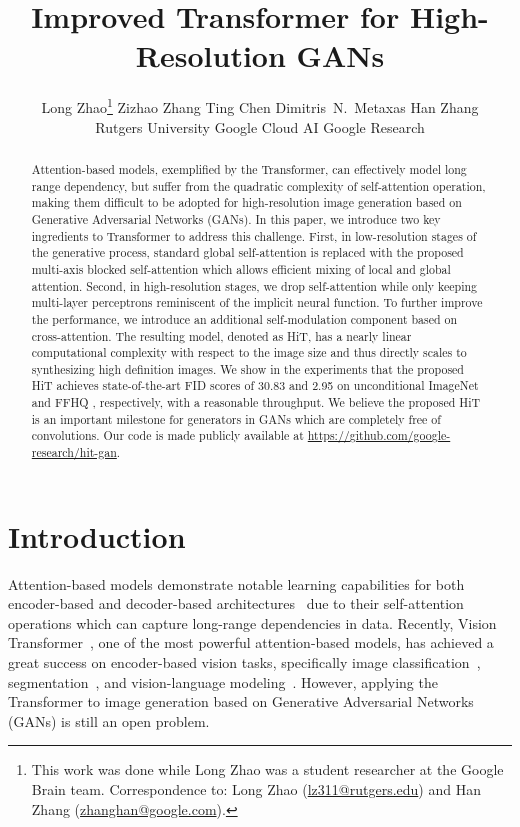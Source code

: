 \documentclass{article}
\title{Improved Transformer for High-Resolution GANs}
\author{
Long Zhao\thanks{This work was done while Long Zhao was a student researcher at the Google Brain team. Correspondence to: Long Zhao (\href{mailto:lz311@cs.rutgers.edu}{lz311@rutgers.edu}) and Han Zhang (\href{mailto:zhanghan@google.com}{zhanghan@google.com}).}
\quad 
Zizhao Zhang 
\quad 
Ting Chen 
\quad
Dimitris~N.~Metaxas
\quad
Han Zhang  \\
 Rutgers University \quad Google Cloud AI \quad Google Research\\
}
\begin{document}
\maketitle

\begin{abstract}


  Attention-based models, exemplified by the Transformer, can effectively model long range dependency, but suffer from the quadratic complexity of self-attention operation, making them difficult to be adopted for high-resolution image generation based on Generative Adversarial Networks (GANs). In this paper, we introduce two key ingredients to Transformer to address this challenge. First, in low-resolution stages of the generative process, standard global self-attention is replaced with the proposed multi-axis blocked self-attention which allows efficient mixing of local and global attention. Second, in high-resolution stages, we drop self-attention while only keeping multi-layer perceptrons reminiscent of the implicit neural function. To further improve the performance, we introduce an additional self-modulation component based on cross-attention. The resulting model, denoted as HiT, has a nearly linear computational complexity with respect to the image size and thus directly scales to synthesizing high definition images. We show in the experiments that the proposed HiT achieves state-of-the-art FID scores of 30.83 and 2.95 on unconditional ImageNet  and FFHQ , respectively, with a reasonable throughput. We believe the proposed HiT is an important milestone for generators in GANs which are completely free of convolutions. Our code is made publicly available at \url{https://github.com/google-research/hit-gan}.
\end{abstract} 
\section{Introduction}

Attention-based models demonstrate notable learning capabilities for both encoder-based and decoder-based architectures~\cite{wang2018non,zhang2019self} due to their self-attention operations which can capture long-range dependencies in data. Recently, Vision Transformer~\cite{dosovitskiy2021image}, one of the most powerful attention-based models, has achieved a great success on encoder-based vision tasks, specifically image classification~\cite{dosovitskiy2021image,touvron2020training}, segmentation~\cite{liu2021swin,wang2021max}, and vision-language modeling~\cite{radford2021learning}. However, applying the Transformer to image generation based on Generative Adversarial Networks (GANs) is still an open problem.
\end{document}
